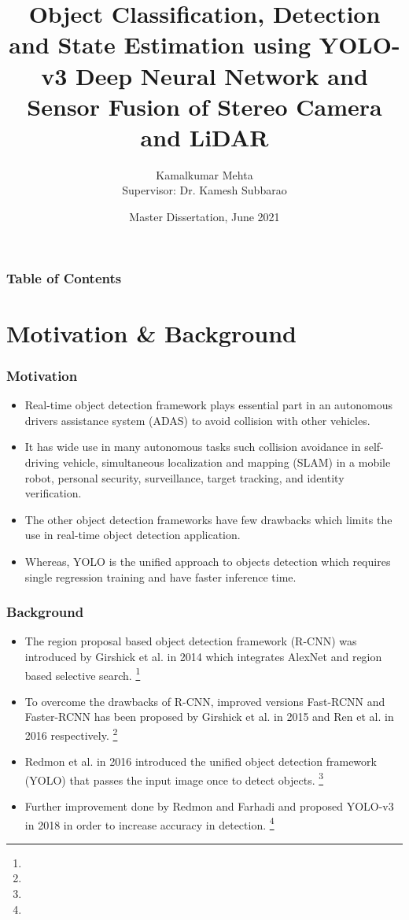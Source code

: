 \documentclass[10pt]{beamer}
\title[Object States Estimation] %
{Object Classification, Detection and State Estimation using YOLO-v3 Deep Neural
Network and Sensor Fusion of Stereo Camera and LiDAR}
\author[K. Mehta] %
{Kamalkumar Mehta\\
 Supervisor: Dr. Kamesh Subbarao}
\institute[UTA] %
{
  Aerospace System Laboratory\\
  Department of Mechanical and Aerospace Engineering\\
  The University of Texas at Arlington
}
\date %
{Master Dissertation, June 2021}
\begin{document}
\frame{\titlepage}

\begin{frame}
\frametitle{Table of Contents}
\tableofcontents
\end{frame}



\section{Motivation \& Background}

\begin{frame}
\frametitle{Motivation}
\begin{itemize}
    \item Real-time object detection framework plays essential part in an autonomous drivers assistance system (ADAS) to avoid collision with other vehicles. 
    \item It has wide use in many autonomous tasks such collision avoidance in self-driving vehicle, simultaneous localization and mapping (SLAM) in a mobile robot, personal security, surveillance, target tracking, and identity verification.   
    \item The other object detection frameworks have few drawbacks which limits the use in real-time object detection application.  
    \item Whereas, YOLO is the unified approach to objects detection which requires \alert{single regression training} and have \alert{faster inference time}.   
\end{itemize}
\end{frame}

\begin{frame}
\frametitle{Background}
\begin{itemize}
    \item The region proposal based object detection framework (R-CNN) was introduced by Girshick et al. in 2014 which integrates AlexNet and region based selective search. \footnote[frame]{}
    \item To overcome the drawbacks of R-CNN, improved versions Fast-RCNN and Faster-RCNN has been proposed by Girshick et al. in 2015 and Ren et al. in 2016 respectively. \footnote[frame]{}
    \item Redmon et al. in 2016 introduced the unified object detection framework (YOLO) that passes the input image once to detect objects. \footnote[frame]{}
    \item Further improvement done by Redmon and Farhadi and proposed YOLO-v3 in 2018 in order to increase accuracy in detection. \footnote[frame]{}   
\end{itemize}

\end{frame}
\end{document}
